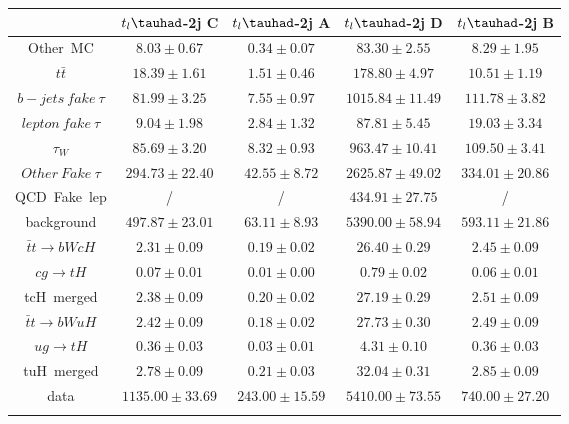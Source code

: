 \centering
\begin{tabular}{ccccc} \toprule\toprule
 & $t_{l}\tauhad$-2j C & $t_{l}\tauhad$-2j A & $t_{l}\tauhad$-2j D & $t_{l}\tauhad$-2j B\\\midrule
Other~MC & $8.03\pm0.67$ & $0.34\pm0.07$ & $83.30\pm2.55$ & $8.29\pm1.95$\\
$t\bar{t}$ & $18.39\pm1.61$ & $1.51\pm0.46$ & $178.80\pm4.97$ & $10.51\pm1.19$\\
$b-jets~fake~\tau$ & $81.99\pm3.25$ & $7.55\pm0.97$ & $1015.84\pm11.49$ & $111.78\pm3.82$\\
$lepton~fake~\tau$ & $9.04\pm1.98$ & $2.84\pm1.32$ & $87.81\pm5.45$ & $19.03\pm3.34$\\
$\tau_{W}$ & $85.69\pm3.20$ & $8.32\pm0.93$ & $963.47\pm10.41$ & $109.50\pm3.41$\\
$Other~Fake~\tau$ & $294.73\pm22.40$ & $42.55\pm8.72$ & $2625.87\pm49.02$ & $334.01\pm20.86$\\
QCD~Fake~lep &  / &  / & $434.91\pm27.75$ &  /\\
background & $497.87\pm23.01$ & $63.11\pm8.93$ & $5390.00\pm58.94$ & $593.11\pm21.86$\\\midrule
$\bar{t}t\to bWcH$ & $2.31\pm0.09$ & $0.19\pm0.02$ & $26.40\pm0.29$ & $2.45\pm0.09$\\
$cg\to tH$ & $0.07\pm0.01$ & $0.01\pm0.00$ & $0.79\pm0.02$ & $0.06\pm0.01$\\
tcH~merged & $2.38\pm0.09$ & $0.20\pm0.02$ & $27.19\pm0.29$ & $2.51\pm0.09$\\
$\bar{t}t\to bWuH$ & $2.42\pm0.09$ & $0.18\pm0.02$ & $27.73\pm0.30$ & $2.49\pm0.09$\\
$ug\to tH$ & $0.36\pm0.03$ & $0.03\pm0.01$ & $4.31\pm0.10$ & $0.36\pm0.03$\\
tuH~merged & $2.78\pm0.09$ & $0.21\pm0.03$ & $32.04\pm0.31$ & $2.85\pm0.09$\\\midrule
data & $1135.00\pm33.69$ & $243.00\pm15.59$ & $5410.00\pm73.55$ & $740.00\pm27.20$\\
\bottomrule\bottomrule\\
\end{tabular}
